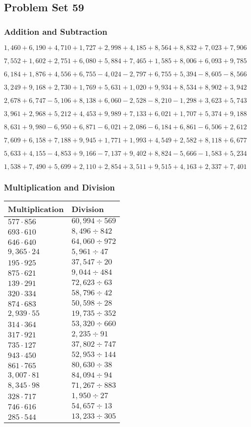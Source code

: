 \hypertarget{problem-set-59-2}{%
\subsection{Problem Set 59}\label{problem-set-59-2}}

\hypertarget{addition-and-subtraction-221}{%
\subsubsection{Addition and
Subtraction}\label{addition-and-subtraction-221}}

\(1,460+6,190+4,710+1,727+2,998+4,185+8,564+8,832+7,023+ 7,906\)

\(7,552+1,602+2,751+6,080+5,884+7,465+1,585+8,006+6,093+9,785\)

\(6,184+1,876+4,556+6,755-4,024-2,797+6,755+5,394-8,605-8,566\)

\(3,249+9,168+2,730+1,769+5,631+1,020+9,934+8,534+8,902+3,942\)

\(2,678+6,747-5,106+8,138+6,060-2,528-8,210-1,298+3,623+5,743\)

\(3,961+2,968+5,212+4,453+9,989+7,133+6,021+1,707+5,374+9,188\)

\(8,631+9,980-6,950+6,871-6,021+2,086-6,184+6,861-6,506+2,612\)

\(7,609+6,158+7,188+9,945+1,771+1,993+4,549+2,582+8,118+6,677\)

\(5,633+4,155-4,853+9,166-7,137+9,402+8,824-5,666-1,583+5,234\)

\(1,538+7,490+5,699+2,110+2,854+3,511+9,515+4,163+2,337+7,401\)

\hypertarget{multiplication-and-division-220}{%
\subsubsection{Multiplication and
Division}\label{multiplication-and-division-220}}

\begin{longtable}[]{@{}ll@{}}
\toprule
Multiplication & Division\tabularnewline
\midrule
\endhead
\(577\cdot856\) & \(60,994÷569\)\tabularnewline
\(693\cdot610\) & \(8,496÷842\)\tabularnewline
\(646\cdot640\) & \(64,060÷972\)\tabularnewline
\(9,365\cdot24\) & \(5,961÷47\)\tabularnewline
\(195\cdot925\) & \(37,547÷20\)\tabularnewline
\(875\cdot621\) & \(9,044÷484\)\tabularnewline
\(139\cdot291\) & \(72,623÷63\)\tabularnewline
\(320\cdot334\) & \(58,796÷42\)\tabularnewline
\(874\cdot683\) & \(50,598÷28\)\tabularnewline
\(2,939\cdot55\) & \(19,735÷352\)\tabularnewline
\(314\cdot364\) & \(53,320÷660\)\tabularnewline
\(317\cdot921\) & \(2,235÷91\)\tabularnewline
\(735\cdot127\) & \(37,802÷747\)\tabularnewline
\(943\cdot450\) & \(52,953÷144\)\tabularnewline
\(861\cdot765\) & \(80,630÷38\)\tabularnewline
\(3,007\cdot81\) & \(84,094÷94\)\tabularnewline
\(8,345\cdot98\) & \(71,267÷883\)\tabularnewline
\(328\cdot717\) & \(1,950÷27\)\tabularnewline
\(746\cdot616\) & \(54,657÷13\)\tabularnewline
\(285\cdot544\) & \(13,233÷305\)\tabularnewline
\bottomrule
\end{longtable}

